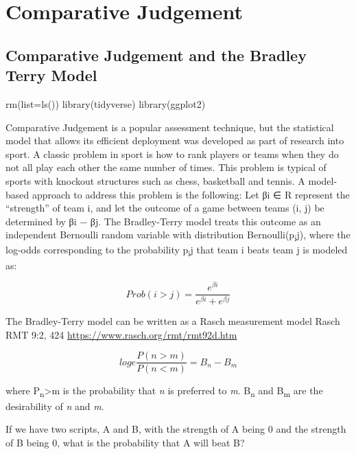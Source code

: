 \documentclass[
  letterpaper,
  DIV=11,
  numbers=noendperiod]{scrreprt}
\newenvironment{Shaded}{\begin{snugshade}}{\end{snugshade}}
\newcommand{\AttributeTok}[1]{\textcolor[rgb]{0.40,0.45,0.13}{#1}}
\newcommand{\FunctionTok}[1]{\textcolor[rgb]{0.28,0.35,0.67}{#1}}
\newcommand{\NormalTok}[1]{\textcolor[rgb]{0.00,0.23,0.31}{#1}}
\begin{document}
\part{Comparative Judgement}

\hypertarget{comparative-judgement-and-the-bradley-terry-model}{%
\chapter{Comparative Judgement and the Bradley Terry
Model}\label{comparative-judgement-and-the-bradley-terry-model}}

\begin{Shaded}
\begin{Highlighting}[]
\FunctionTok{rm}\NormalTok{(}\AttributeTok{list=}\FunctionTok{ls}\NormalTok{())}
\FunctionTok{library}\NormalTok{(tidyverse)}
\FunctionTok{library}\NormalTok{(ggplot2)}
\end{Highlighting}
\end{Shaded}

Comparative Judgement is a popular assessment technique, but the
statistical model that allows its efficient deployment was developed as
part of research into sport. A classic problem in sport is how to rank
players or teams when they do not all play each other the same number of
times. This problem is typical of sports with knockout structures such
as chess, basketball and tennis. A model-based approach to address this
problem is the following: Let βi ∈ R represent the ``strength'' of team
i, and let the outcome of a game between teams (i, j) be determined by
βi − βj. The Bradley-Terry model treats this outcome as an independent
Bernoulli random variable with distribution
Bernoulli(p\textsubscript{i}j), where the log-odds corresponding to the
probability p\textsubscript{i}j that team i beats team j is modeled as:

\[
Prob(i > j) = \frac{e^{\beta i}}{e^{\beta i} + e^{\beta j}}
\]

The Bradley-Terry model can be written as a Rasch measurement model
Rasch RMT 9:2, 424 \url{https://www.rasch.org/rmt/rmt92d.htm}

\[
log e \frac{P (n > m)}{P (n<m)} = B_n - B_m
\]

where P\textsubscript{n}\textgreater m is the probability that \emph{n}
is preferred to \emph{m}. B\textsubscript{n} and B\textsubscript{m} are
the desirability of \emph{n} and \emph{m}.

If we have two scripts, A and B, with the strength of A being 0 and the
strength of B being 0, what is the probability that A will beat B?
\end{document}
